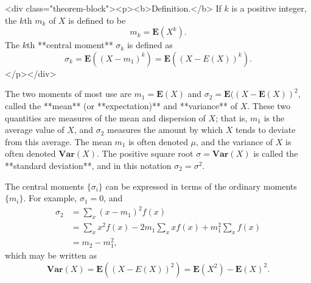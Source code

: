 <div class="theorem-block"><p><b>Definition.</b> 
If $k$ is a positive integer, the $k$th  $m_k$ of $X$ is defined to be 
$$\begin{equation}
    m_k = \mathbf{E}(X^k).
\end{equation}$$
The $k$th **central moment** $\sigma_k$ is defined as
$$\begin{equation}
    \sigma_k = \mathbf{E}\left( (X-m_1)^k \right) = \mathbf{E}\left( (X-E(X))^k \right).
\end{equation}$$ 
</p></div>

The two moments of most use are $m_1 = \mathbf{E}(X)$ and $\sigma_2 = \mathbf{E}( (X - \mathbf{E}(X))^2$, called the **mean** (or **expectation)** and **variance** of $X$. These two quantities are measures of the mean and dispersion of $X$; that is, $m_1$ is the average value of $X$, and $\sigma_2$ measures the amount by which $X$ tends to deviate from this average. The mean $m_1$ is often denoted $\mu$, and the variance of $X$ is often denoted $\mathbf{Var}(X)$. The positive square root $\sigma = \mathbf{Var}(X)$ is called the **standard deviation**, and in this notation $\sigma_2 = \sigma^2$. 

The central moments $\{\sigma_i\}$ can be expressed in terms of the ordinary moments $\{m_i\}$. For example, $\sigma_1 = 0$, and 
$$\begin{equation}
    \begin{aligned} 
        \sigma_{2} &=\sum_{x}\left(x-m_{1}\right)^{2} f(x) \\ 
        &=\sum_{x} x^{2} f(x)-2 m_{1} \sum_{x} x f(x)+m_{1}^{2} \sum_{x} f(x) \\ 
        &=m_{2}-m_{1}^{2} ,
    \end{aligned}
\end{equation}$$
which may be written as 
$$$$$$$$\begin{equation}
    \label{eq:4-1}
    \tag{4-1}
    \mathbf{Var}(X) = \mathbf{E}\left( (X-E(X))^2 \right) = \mathbf{E}(X^2) - \mathbf{E}(X)^2.
\end{equation}$$$$$$$$

